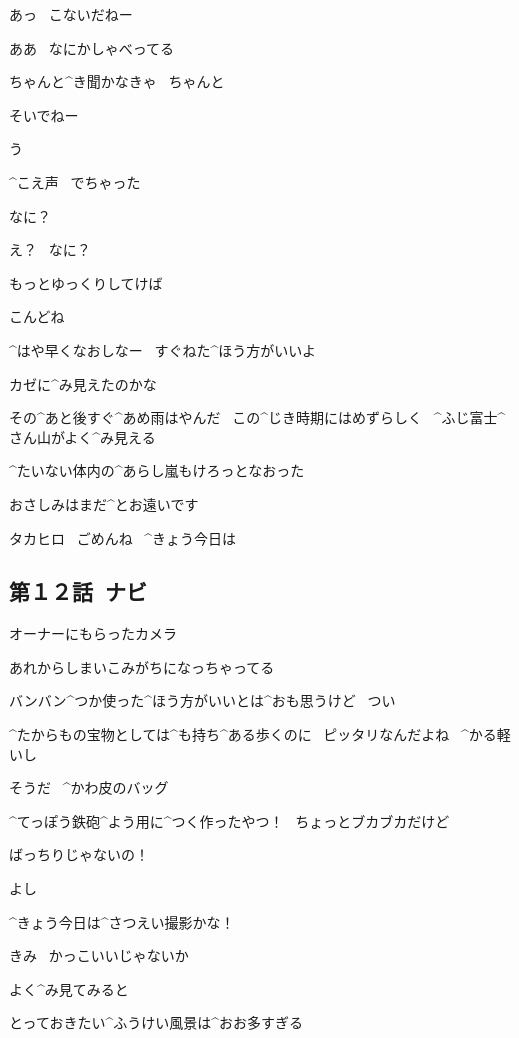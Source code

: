 \page[62]
\Takahiro あっ
\ こないだねー

\Alpha ああ
\ なにかしゃべってる

\Alpha ちゃんと^{き}{聞}かなきゃ
\ ちゃんと

\page[63]
\Takahiro そいでねー

\Alpha う

\Alpha ^{こえ}{声}
\ でちゃった

\Takahiro なに？

\Alpha え？
\ なに？

\page[64]
\Alpha もっとゆっくりしてけば

\Takahiro こんどね

\Takahiro ^{はや}{早}くなおしなー
\ すぐねた^{ほう}{方}がいいよ

\Alpha カゼに^{み}{見}えたのかな

\page[65]
\Alpha その^{あと}{後}すぐ^{あめ}{雨}はやんだ
\ この^{じき}{時期}にはめずらしく
\ ^{ふじ}{富士}^{さん}{山}がよく^{み}{見}える

\Alpha ^{たいない}{体内}の^{あらし}{嵐}もけろっとなおった

\page[66]
\Alpha おさしみはまだ^{とお}{遠}いです

\Alpha タカヒロ
\ ごめんね
\ ^{きょう}{今日}は


\subsection{第１２話\ ナビ}

\page[68]
\Alpha オーナーにもらったカメラ

\Alpha あれからしまいこみがちになっちゃってる

\Alpha バンバン^{つか}{使}った^{ほう}{方}がいいとは^{おも}{思}うけど
\ つい

\Alpha ^{たからもの}{宝物}としては^{も}{持}ち^{ある}{歩}くのに
\ ピッタリなんだよね
\ ^{かる}{軽}いし

\page[69]
\Alpha そうだ
\ ^{かわ}{皮}のバッグ

\Alpha ^{てっぽう}{鉄砲}^{よう}{用}に^{つく}{作}ったやつ！
\ ちょっとブカブカだけど

\Alpha ばっちりじゃないの！

\Alpha よし

\Alpha ^{きょう}{今日}は^{さつえい}{撮影}かな！

\page[70]
\Alpha きみ
\ かっこいいじゃないか

\page[71]
\Alpha よく^{み}{見}てみると

\Alpha とっておきたい^{ふうけい}{風景}は^{おお}{多}すぎる

